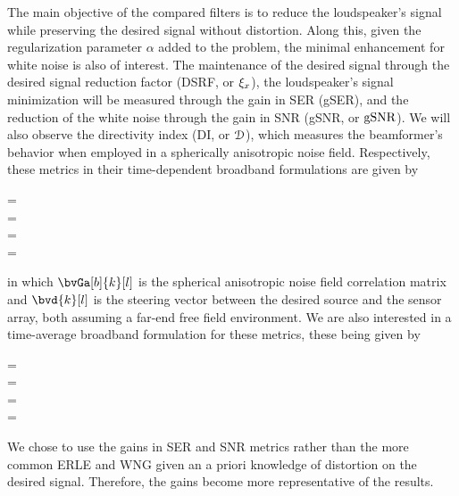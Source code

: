 The main objective of the compared filters is to reduce the loudspeaker's signal while preserving the desired signal without distortion. Along this, given the regularization parameter $\alpha$ added to the problem, the minimal enhancement for white noise is also of interest. The maintenance of the desired signal through the desired signal reduction factor (DSRF, or $\xi_{x}$), the loudspeaker's signal minimization will be measured through the gain in SER (gSER), and the reduction of the white noise through the gain in SNR (gSNR, or $\text{gSNR}$). We will also observe the directivity index (DI, or $\mathcal{D}$), which measures the beamformer's behavior when employed in a spherically anisotropic noise field. Respectively, these metrics in their time-dependent broadband formulations are given by
\begin{subgather}
	\dsrf[l] =  \\
	\gser[l] =  \cdot {}\\
	\gsnr[l] =  \cdot {} \\
	\di[l] = 
\end{subgather}
in which $\bvGa[b]{k}[l]$ is the spherical anisotropic noise field correlation matrix \cite{habets_generating_2007} and $\bvd{k}[l]$ is the steering vector between the desired source and the sensor array, both assuming a far-end free field environment. We are also interested in a time-average broadband formulation for these metrics, these being given by
\begin{subgather}
	\dsrf =  \\
	\gser =  \cdot {} \\
	\gsnr =  \cdot {} \\
	\di = 
\end{subgather}

We chose to use the gains in SER and SNR metrics rather than the more common ERLE and WNG \cite{wada_enhancement_2012} given an a priori knowledge of distortion on the desired signal. Therefore, the gains become more representative of the results.

